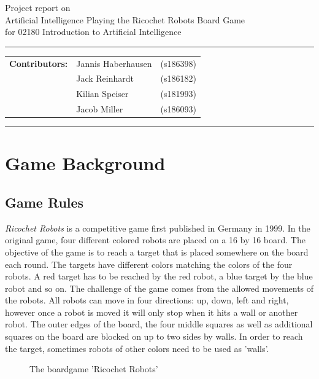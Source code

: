 \documentclass[a4paper,10pt]{article}
\begin{document}
\begin{center}
Project report on\\
\vspace{0.5cm}
{{\Large \sc Artificial Intelligence Playing the Ricochet Robots Board Game}}\\
\vspace{0.5cm} for 02180 Introduction to Artificial Intelligence
\end{center}
\rule{\textwidth}{0.5pt}
\begin{description}
\item\begin{tabular}{rll}
    \textbf{Contributors:}& Jannis Haberhausen &(s186398)\\ & Jack Reinhardt &(s186182)\\ & Kilian Speiser &(s181993)\\ & Jacob Miller &(s186093) \\
\end{tabular}
\end{description}
\rule{\textwidth}{1pt}

\tableofcontents
\thispagestyle{empty}
\newpage
\section{Game Background}
\subsection{Game Rules}
\label{subsec:gameRules}
\textit{Ricochet Robots} is a competitive game first published in Germany in 1999. In the original game, four different colored robots are placed on a 16 by 16 board.
The objective of the game is to reach a target that is placed somewhere on the board each round. The targets have different colors matching the colors of the four robots.
A red target has to be reached by the red robot, a blue target by the blue robot and so on. The challenge of the game comes from the allowed movements of the robots. All
robots can move in four directions: up, down, left and right, however once a robot is moved it will only stop when it hits a wall or another robot. The outer edges of the
board, the four middle squares as well as additional squares on the board are blocked on up to two sides by walls. In order to reach the target, sometimes robots of other colors
need to be used as 'walls'.
\begin{figure}[!htb]
\caption{The boardgame 'Ricochet Robots'}
\label{fig:originalgame}
\end{figure}
\end{document}
